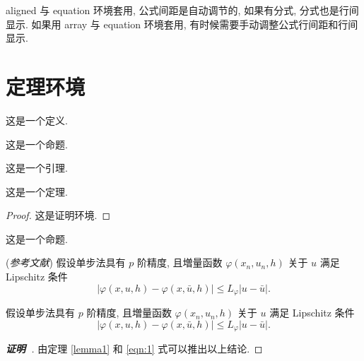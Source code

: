 \documentclass[master,print]{shnuthesis}
\begin{document}
aligned 与 equation 环境套用, 公式间距是自动调节的, 如果有分式, 分式也是行间显示. 如果用 array 与 equation 环境套用, 有时候需要手动调整公式行间距和行间显示.



\section{定理环境}

\begin{definition}
这是一个定义.
\end{definition}

\begin{proposition}
这是一个命题.
\end{proposition}

\begin{lemma}[Lemma]\label{lemma1}
这是一个引理.
\end{lemma}

\begin{theorem}[Theorem]
这是一个定理.
\end{theorem}
\begin{proof}
这是证明环境.
\end{proof}

\begin{proposition}[Proposition]
这是一个命题.
\end{proposition}

\begin{lemma}\label{lemma-convergence} {\rm (\textit{参考文献}\cite{LiLiu1997})}
假设单步法具有 $p$ 阶精度, 且増量函数 $\varphi(x_{n}, u_{n}, h)$ 关于 $u$ 满足 {\rm Lipschitz} 条件
\begin{equation}\label{eqn:3}
|\varphi(x, u, h)-\varphi(x, \bar{u}, h)| \leqslant L_{\varphi}|u-\bar{u}|.
\end{equation}
\end{lemma}

\begin{theorem}\label{theorem-convergence}
假设单步法具有 $p$ 阶精度, 且増量函数 $\varphi(x_{n}, u_{n}, h)$ 关于 $u$ 满足 {\rm Lipschitz} 条件
\begin{equation}\label{eqn:4}
|\varphi(x, u, h)-\varphi(x, \bar{u}, h)| \leqslant L_{\varphi}|u-\bar{u}|.
\end{equation}
\end{theorem}
\begin{proof}[\normalfont\bfseries 证明~\nopunct]
由定理 \ref{lemma1} 和 \eqref{eqn:1} 式可以推出以上结论.
\end{proof}
\end{document}
